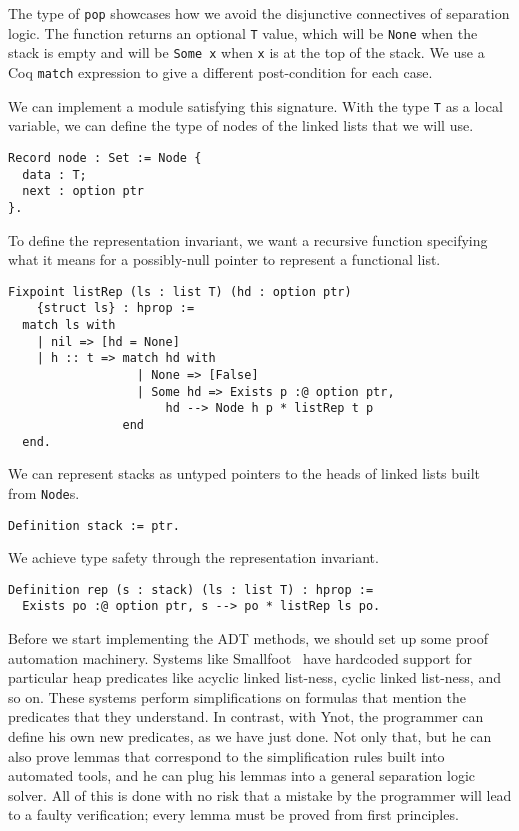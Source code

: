 \documentclass[preprint,nocopyrightspace]{sigplanconf}
\newcommand{\cd}[1]{\texttt{#1}}
\begin{document}
The type of \cd{pop} showcases how we avoid the disjunctive connectives of separation logic.  The function returns an optional \cd{T} value, which will be \cd{None} when the stack is empty and will be \cd{Some x} when \cd{x} is at the top of the stack.  We use a Coq \cd{match} expression to give a different post-condition for each case.

\medskip

We can implement a module satisfying this signature.  With the type \cd{T} as a local variable, we can define the type of nodes of the linked lists that we will use.

\begin{verbatim}
Record node : Set := Node {
  data : T;
  next : option ptr
}.
\end{verbatim}

To define the representation invariant, we want a recursive function specifying what it means for a possibly-null pointer to represent a functional list.

\begin{verbatim}
Fixpoint listRep (ls : list T) (hd : option ptr)
    {struct ls} : hprop :=
  match ls with
    | nil => [hd = None]
    | h :: t => match hd with
                  | None => [False]
                  | Some hd => Exists p :@ option ptr,
                      hd --> Node h p * listRep t p
                end
  end.
\end{verbatim}

We can represent stacks as untyped pointers to the heads of linked lists built from \cd{Node}s.

\begin{verbatim}
Definition stack := ptr.
\end{verbatim}

We achieve type safety through the representation invariant.

\begin{verbatim}
Definition rep (s : stack) (ls : list T) : hprop :=
  Exists po :@ option ptr, s --> po * listRep ls po.
\end{verbatim}

Before we start implementing the ADT methods, we should set up some proof automation machinery.  Systems like Smallfoot~\cite{smallfoot} have hardcoded support for particular heap predicates like acyclic linked list-ness, cyclic linked list-ness, and so on.  These systems perform simplifications on formulas that mention the predicates that they understand.  In contrast, with Ynot, the programmer can define his own new predicates, as we have just done.  Not only that, but he can also prove lemmas that correspond to the simplification rules built into automated tools, and he can plug his lemmas into a general separation logic solver.  All of this is done with no risk that a mistake by the programmer will lead to a faulty verification; every lemma must be proved from first principles.
\end{document}
